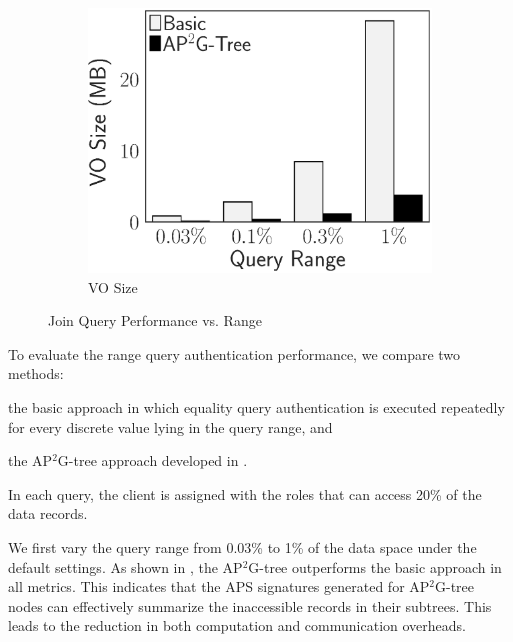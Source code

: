 \begin{figure}[t]
\begin{subfigure}{.33\linewidth}
        \includegraphics[height=\ht\figbox]{exp-figs/access-control/join_vo.eps}
        \caption{VO Size}
    \end{subfigure}
    \caption{Join Query Performance vs. Range}\label{exp-fig:access-control:join}
\end{figure}

To evaluate the range query authentication performance, we compare two methods:
\begin{inlineenum}
    \item the basic approach in which equality query authentication is executed repeatedly for every discrete value lying in the query range, and
    \item the AP$^2$G-tree approach developed in .
\end{inlineenum}
In each query, the client is assigned with the roles that can access 20\% of the data records.

We first vary the query range from 0.03\% to 1\% of the data space under the default settings. As shown in , the AP$^2$G-tree outperforms the basic approach in all metrics. This indicates that the APS signatures generated for AP$^2$G-tree nodes can effectively summarize the inaccessible records in their subtrees. This leads to the reduction in both computation and communication overheads.

